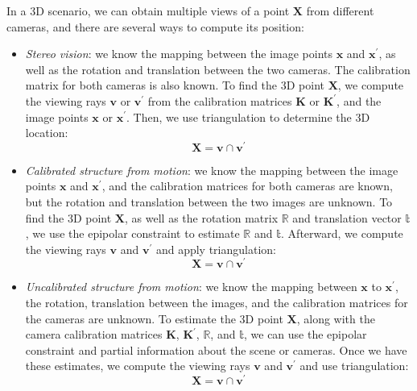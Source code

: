 \noindent In a 3D scenario, we can obtain multiple views of a point $\mathbf{X}$ from different cameras, and there are several ways to compute its position:
\begin{itemize}
    \item \textit{Stereo vision}: we know the mapping between the image points $\mathbf{x}$ and $\mathbf{x}^\prime$, as well as the rotation and translation between the two cameras.
        The calibration matrix for both cameras is also known.
        To find the 3D point $\mathbf{X}$, we compute the viewing rays $\mathbf{v}$ or $\mathbf{v}^\prime$ from the calibration matrices $\mathbf{K}$ or $\mathbf{K}^\prime$, and the image points $\mathbf{x}$ or $\mathbf{x}^\prime$. 
        Then, we use triangulation to determine the 3D location:      
        \[\mathbf{X}=\mathbf{v}\cap\mathbf{v}^\prime\]
    \item \textit{Calibrated structure from motion}: we know the mapping between the image points $\mathbf{x}$ and $\mathbf{x}^\prime$, and the calibration matrices for both cameras are known, but the rotation and translation between the two images are unknown.
        To find the 3D point $\mathbf{X}$, as well as the rotation matrix $\mathbb{R}$ and translation vector $\mathbb{t}$, we use the epipolar constraint to estimate $\mathbb{R}$ and $\mathbb{t}$. 
        Afterward, we compute the viewing rays $\mathbf{v}$ and $\mathbf{v}^\prime$ and apply triangulation:
        \[\mathbf{X}=\mathbf{v}\cap\mathbf{v}^\prime\]
    \item \textit{Uncalibrated structure from motion}: we know the mapping between $\mathbf{x}$ to $\mathbf{x}^\prime$, the rotation, translation between the images, and the calibration matrices for the cameras are unknown.
        To estimate the 3D point $\mathbf{X}$, along with the camera calibration matrices $\mathbf{K}$, $\mathbf{K}^\prime$, $\mathbb{R}$, and $\mathbb{t}$, we can use the epipolar constraint and partial information about the scene or cameras.
        Once we have these estimates, we compute the viewing rays $\mathbf{v}$ and $\mathbf{v}^\prime$ and use triangulation:
        \[\mathbf{X}=\mathbf{v}\cap\mathbf{v}^\prime\]
\end{itemize}